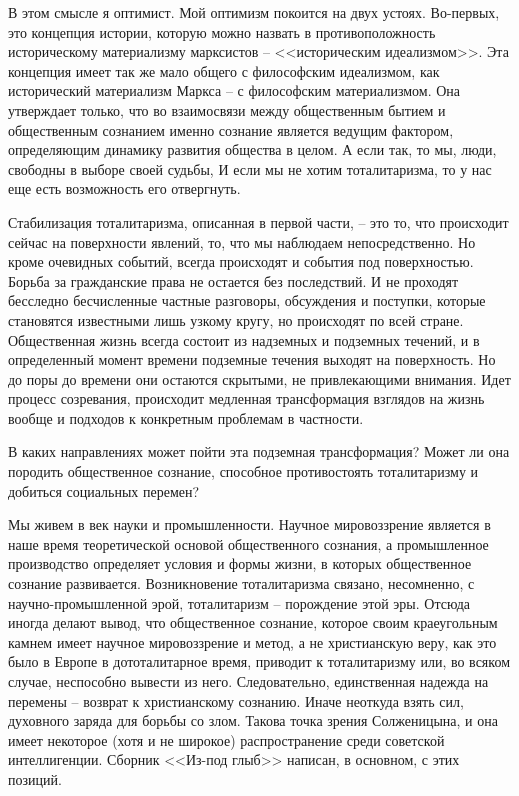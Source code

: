 \documentclass{book}
\begin{document}
В этом смысле я оптимист. Мой оптимизм покоится на двух устоях. Во-первых, это концепция истории, которую можно назвать в противоположность историческому материализму марксистов -- <<историческим идеализмом>>. Эта концепция имеет так же мало общего с философским идеализмом, как исторический материализм Маркса -- с философским матери­ализмом. Она утверждает только, что во взаимосвязи между общественным бытием и общественным сознанием именно со­знание является ведущим фактором, определяющим динамику развития общества в целом. А если так, то мы, люди, свободны в выборе своей судьбы, И если мы не хотим тоталитаризма, то у нас еще есть возможность его отвергнуть.

Стабилизация тоталитаризма, описанная в первой части, -- это то, что происходит сейчас на поверхности явлений, то, что мы наблюдаем непосредственно. Но кроме очевидных событий, всегда происходят и события под поверхностью. Борьба за гражданские права не остается без последствий. И не проходят бесследно бесчисленные частные разговоры, обсуждения и по­ступки, которые становятся известными лишь узкому кругу, но происходят по всей стране. Общественная жизнь всегда со­стоит из надземных и подземных течений, и в определенный момент времени подземные течения выходят на поверхность. Но до поры до времени они остаются скрытыми, не привлекаю­щими внимания. Идет процесс созревания, происходит медлен­ная трансформация взглядов на жизнь вообще и подходов к конкретным проблемам в частности.

В каких направлениях может пойти эта подземная трансфор­мация? Может ли она породить общественное сознание, способ­ное противостоять тоталитаризму и добиться социальных пере­мен?

Мы живем в век науки и промышленности. Научное мировоззрение является в наше время теоретической основой общественного сознания, а промышленное производство определяет условия и формы жизни, в которых общественное сознание развивается. Возникновение тоталитаризма связано, несомненно, с научно-промышленной эрой, тоталитаризм -- порождение этой эры. Отсюда иногда делают вывод, что общественное сознание, которое своим краеугольным камнем имеет научное мировоззрение и метод, а не христианскую веру, как это было в Европе в дототалитарное время, приводит к тоталитаризму или, во всяком случае, неспособно вывести из него. Следовательно, единственная надежда на перемены -- возврат к хри­стианскому сознанию. Иначе неоткуда взять сил, духовного заряда для борьбы со злом. Такова точка зрения Солженицына, и она имеет некоторое (хотя и не широкое) распространение среди советской интеллигенции. Сборник <<Из-под глыб>> напи­сан, в основном, с этих позиций.
\end{document}
